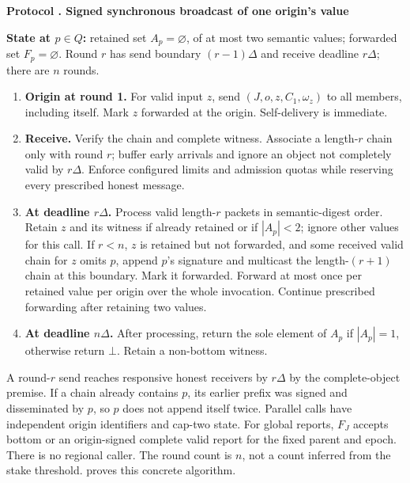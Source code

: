 \documentclass[11pt,a4paper,onecolumn]{article}
\newcommand{\botv}{\bot}
\theoremstyle{remark}\newtheorem{example}[definition]{Example}
\newcounter{protocol}
\newenvironment{protocol}[2]{\refstepcounter{protocol}\label{#1}\begin{mdframed}[nobreak=true,linewidth=.6pt,skipabove=10pt,skipbelow=10pt,innertopmargin=8pt,innerbottommargin=8pt]\small\raggedright\noindent\textbf{Protocol \theprotocol. #2}\par\smallskip}{\end{mdframed}}
\begin{document}
\begin{protocol}{alg:ab}{Signed synchronous broadcast of one origin's value}
\textbf{State at $p\in Q$:} retained set $A_p=\varnothing$, of at most two
semantic values; forwarded set $F_p=\varnothing$. Round $r$ has send boundary
$(r-1)\Delta$ and receive deadline $r\Delta$; there are $n$ rounds.
\begin{enumerate}[label=\textbf{A\arabic*.}]
\item \textbf{Origin at round 1.} For valid input $z$, send
$(J,o,z,C_1,\omega_z)$ to all members, including itself. Mark $z$ forwarded
at the origin. Self-delivery is immediate.
\item \textbf{Receive.} Verify the chain and complete witness. Associate a
length-$r$ chain only with round $r$; buffer early arrivals and ignore an object
not completely valid by $r\Delta$. Enforce configured limits and admission
quotas while reserving every prescribed honest message.
\item \textbf{At deadline $r\Delta$.} Process valid length-$r$ packets in
semantic-digest order. Retain $z$ and its witness if already retained or if
$|A_p|<2$; ignore other values for this call. If $r<n$, $z$ is retained but not
forwarded, and some received valid chain for $z$ omits $p$, append $p$'s signature
and multicast the length-$(r+1)$ chain at this boundary. Mark it forwarded.
Forward at most once per retained value per origin over the whole invocation.
Continue prescribed forwarding after retaining two values.
\item \textbf{At deadline $n\Delta$.} After processing, return the sole element
of $A_p$ if $|A_p|=1$, otherwise return $\botv$. Retain a non-bottom witness.
\end{enumerate}
\end{protocol}

A round-$r$ send reaches responsive honest receivers by $r\Delta$ by the
complete-object premise. If a chain already contains $p$, its earlier prefix
was signed and disseminated by $p$, so $p$ does not append itself twice.
Parallel calls have independent origin identifiers and cap-two state. For global reports, $F_J$ accepts bottom or an origin-signed complete valid
report for the fixed parent and epoch. There is no regional caller. The round count is $n$, not a count inferred
from the stake threshold.  proves this concrete algorithm.
\end{document}
